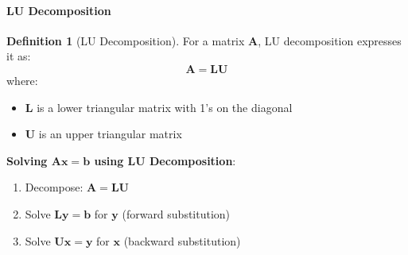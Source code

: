 \documentclass[12pt,a4paper]{article}
\theoremstyle{definition}
\newtheorem{definition}{Definition}[section]
\begin{document}
\paragraph{LU Decomposition}

\begin{definition}[LU Decomposition]
For a matrix $\mathbf{A}$, LU decomposition expresses it as:
\[
\mathbf{A} = \mathbf{LU}
\]
where:
\begin{itemize}
\item $\mathbf{L}$ is a lower triangular matrix with 1's on the diagonal
\item $\mathbf{U}$ is an upper triangular matrix
\end{itemize}
\end{definition}

\textbf{Solving $\mathbf{Ax} = \mathbf{b}$ using LU Decomposition}:
\begin{enumerate}
\item Decompose: $\mathbf{A} = \mathbf{LU}$
\item Solve $\mathbf{Ly} = \mathbf{b}$ for $\mathbf{y}$ (forward substitution)
\item Solve $\mathbf{Ux} = \mathbf{y}$ for $\mathbf{x}$ (backward substitution)
\end{enumerate}
\end{document}
